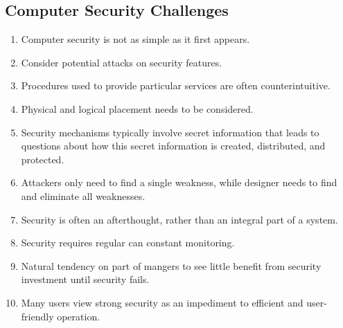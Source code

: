 \documentclass[a4paper]{article}
\theoremstyle{definition}
\theoremstyle{remark}
\begin{document}
	\subsection{Computer Security Challenges}
	\begin{enumerate}
		\item Computer security is not as simple as it first appears.
		\item Consider potential attacks on security features.
		\item Procedures used to provide particular services are often counterintuitive.
		\item Physical and logical placement needs to be considered.
		\item Security mechanisms typically involve secret information that leads to
			questions about how this secret information is created, distributed,
			and protected.
		\item Attackers only need to find a single weakness, while designer needs to find
			and eliminate all weaknesses.
		\item Security is often an afterthought, rather than an integral part of a system.
		\item Security requires regular can constant monitoring.
		\item Natural tendency on part of mangers to see little benefit from security
			investment until security fails.
		\item Many users view strong security as an impediment to efficient and
			user-friendly operation.
	\end{enumerate}
\end{document}
